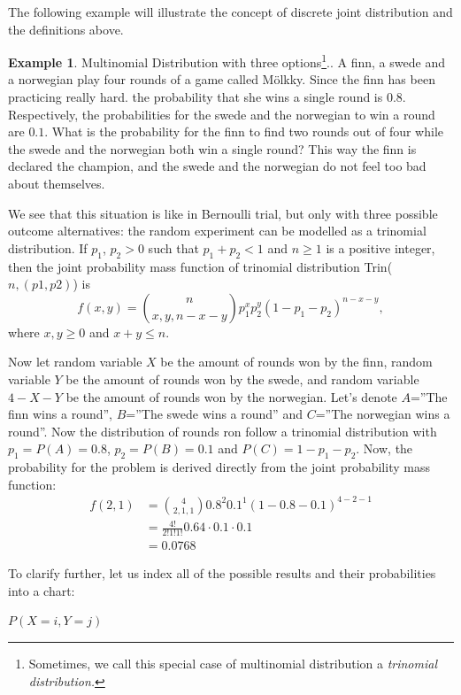 \documentclass[12pt,a4paper,leqno]{report}
\theoremstyle{plain}
\theoremstyle{definition}
\newtheorem{esim}[equation]{Example}
\begin{document}
The following example will illustrate the concept of discrete joint distribution and the definitions above.

\begin{esim}
Multinomial Distribution with three options\footnote{Sometimes, we call this special case of multinomial distribution a \emph{trinomial distribution.}}.. A finn, a swede and a norwegian play four rounds of a game called Mölkky. Since the finn has been practicing really hard. the probability that she wins a single round is $0.8$. Respectively, the probabilities for the swede and the norwegian to win a round are $0.1$. What is the probability for the finn to find two rounds out of four while the swede and the norwegian both win a single round? This way the finn is declared the champion, and the swede and the norwegian do not feel too bad about themselves.

We see that this situation is like in Bernoulli trial, but only with three possible outcome alternatives: the random experiment can be modelled as a trinomial distribution. If $p_1$, $p_2 > 0$ such that $p_1+p_2 < 1$ and $n \geq 1$ is a positive integer, then the joint probability mass function of trinomial distribution Trin($n, (p1,p2)$) is 
\[
f(x,y) = {n \choose x,y,n-x-y} p_1^x p_2^y (1-p_1-p_2)^{n-x-y},
\]
where $x,y \geq 0$ and $x+y \leq n$.

Now let random variable $X$ be the amount of rounds won by the finn, random variable $Y$ be the amount of rounds won by the swede, and random variable $4-X-Y$ be the amount of rounds won by the norwegian. Let's denote $A$=''The finn wins a round'', $B$=''The swede wins a round'' and $C$=''The norwegian wins a round''. Now the distribution of rounds ron follow a trinomial distribution with $p_1 = P(A) = 0.8$, $p_2 = P(B) = 0.1$ and $P(C) = 1- p_1 - p_2$. Now, the probability for the problem is derived directly from the joint probability mass function:
\[
\begin{split}
f(2,1) &= {4 \choose 2,1,1} 0.8^2 0.1^1 (1-0.8-0.1)^{4-2-1} \\
&= \frac{4!}{2!1!1!}0.64 \cdot 0.1 \cdot 0.1 \\
&= 0.0768
\end{split}
\]

To clarify further, let us index all of the possible results and their probabilities into a chart:
\bigskip

\begin{center}
$P(X = i, Y = j)$


\end{center}
\end{esim}
\end{document}
